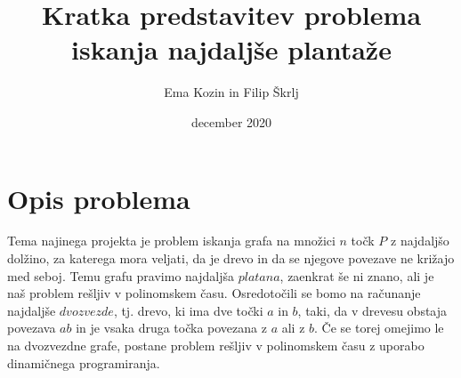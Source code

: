 \documentclass[a4paper,12pt]{article}
\title{Kratka predstavitev problema iskanja najdaljše plantaže}
\author{Ema Kozin in Filip Škrlj}
\date{december 2020}
\begin{document}
\maketitle

\newpage
\section{Opis problema}

Tema najinega projekta je problem iskanja grafa na množici $n$ točk $P$ z najdaljšo dolžino, za katerega mora veljati, da je drevo in da se njegove povezave ne križajo med seboj. Temu grafu pravimo najdaljša $platana$, zaenkrat še ni znano, ali je naš problem rešljiv v polinomskem času.
Osredotočili se bomo na računanje najdaljše $dvozvezde$, tj. drevo, ki ima dve točki $a$ in $b$, taki, da v drevesu obstaja povezava $ab$ in je vsaka druga točka povezana z $a$ ali z $b$. Če se torej omejimo le na dvozvezdne grafe, postane problem rešljiv v polinomskem času z uporabo dinamičnega programiranja.
\end{document}
